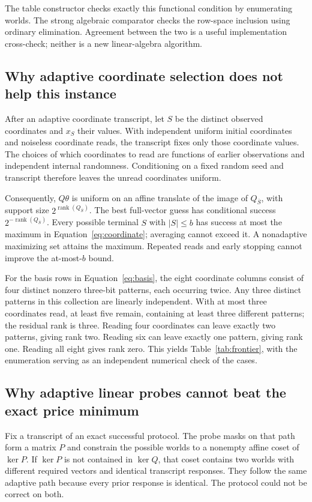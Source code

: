 \documentclass[11pt,letterpaper]{article}
\DeclareMathOperator{\rank}{rank}\DeclareMathOperator{\spanop}{span}
\theoremstyle{remark}\newtheorem{remark}{Remark}[section]
\begin{document}
The table constructor checks exactly this functional condition by enumerating worlds. The strong algebraic comparator checks the row-space inclusion using ordinary elimination. Agreement between the two is a useful implementation cross-check; neither is a new linear-algebra algorithm.

\subsection{Why adaptive coordinate selection does not help this instance}
After an adaptive coordinate transcript, let $S$ be the distinct observed coordinates and $x_S$ their values. With independent uniform initial coordinates and noiseless coordinate reads, the transcript fixes only those coordinate values. The choices of which coordinates to read are functions of earlier observations and independent internal randomness. Conditioning on a fixed random seed and transcript therefore leaves the unread coordinates uniform.

Consequently, $Q\theta$ is uniform on an affine translate of the image of $Q_{\overline S}$, with support size $2^{\rank(Q_{\overline S})}$. The best full-vector guess has conditional success $2^{-\rank(Q_{\overline S})}$. Every possible terminal $S$ with $|S|\le b$ has success at most the maximum in Equation~\eqref{eq:coordinate}; averaging cannot exceed it. A nonadaptive maximizing set attains the maximum. Repeated reads and early stopping cannot improve the at-most-$b$ bound.

For the basis rows in Equation~\eqref{eq:basis}, the eight coordinate columns consist of four distinct nonzero three-bit patterns, each occurring twice. Any three distinct patterns in this collection are linearly independent. With at most three coordinates read, at least five remain, containing at least three different patterns; the residual rank is three. Reading four coordinates can leave exactly two patterns, giving rank two. Reading six can leave exactly one pattern, giving rank one. Reading all eight gives rank zero. This yields Table~\ref{tab:frontier}, with the enumeration serving as an independent numerical check of the cases.

\subsection{Why adaptive linear probes cannot beat the exact price minimum}
Fix a transcript of an exact successful protocol. The probe masks on that path form a matrix $P$ and constrain the possible worlds to a nonempty affine coset of $\ker P$. If $\ker P$ is not contained in $\ker Q$, that coset contains two worlds with different required vectors and identical transcript responses. They follow the same adaptive path because every prior response is identical. The protocol could not be correct on both.
\end{document}

